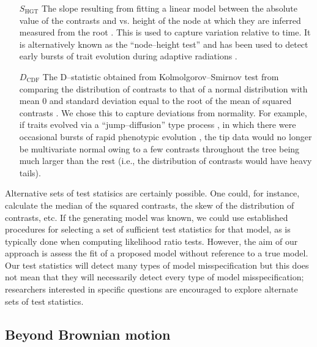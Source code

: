 \documentclass[a4paper,11pt]{article}
\begin{document}
\begin{enumerate}
\item[$S_{\text{HGT}}$] The slope resulting from fitting a linear model between the absolute value of the contrasts and vs. height of the node at which they are inferred measured from the root \citep[after][]{Purvis1995}. This is used to capture variation relative to time. It is alternatively known as the ``node--height test'' and has been used to detect early bursts of trait evolution during adaptive radiations \citep[see][for uses and modifications of this test]{FreckletonHarvey2006, SlaterPennell}. 

\item[$D_{\text{CDF}}$] The D--statistic obtained from Kolmolgorov--Smirnov test from comparing the distribution of contrasts to that of a normal distribution with mean $0$ and standard deviation equal to the root of the mean of squared contrasts \citep[the expected distribution of the contrasts under BM; see][]{Felsenstein1985, Rohlf2001}. We chose this to capture deviations from normality. For example, if traits evolved via a ``jump--diffusion'' type process \citep{Landis2012}, in which there were occasional bursts of rapid phenotypic evolution \citep{PennellPE}, the tip data would no longer be multivariate normal owing to a few contrasts throughout the tree being much larger than the rest (i.e., the distribution of contrasts would have heavy tails). 

\end{enumerate}

Alternative sets of test statisics are certainly possible. One could, for instance, calculate the median of the squared contrasts, the skew of the distribution of contrasts, etc. If the generating model was known, we could use established procedures for selecting a set of sufficient \citep[or, approximately sufficient;][]{MajoramJoyce} test statistics for that model, as is typically done when computing likelihood ratio tests. However, the aim of our approach is assess the fit of a proposed model without reference to a true model. Our test statistics will detect many types of model misspecification but this does not mean that they will necessarily detect every type of model misspecification; researchers interested in specific questions are encouraged to explore alternate sets of test statistics. 

\subsection*{Beyond Brownian motion}
\end{document}
